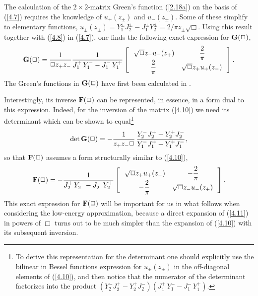 \documentclass[a4paper,preprint,nofootinbib,
                 showpacs,preprintnumbers,amsmath,amssymb]{revtex4}
\begin{document}
The calculation of the $2\times2$-matrix Green's function 
(\ref{2.18a}) on the basis of (\ref{4.7}) requires the knowledge 
of $u_+(z_\pm)$ and $u_-(z_\pm)$. Some of these simplify to 
elementary functions, 
    $u_\pm(z_\pm)=Y_1^\pm J_2^\pm 
    -J_1^\pm Y_2^\pm=2/{\pi z_\pm\sqrt\Box}$. 
Using this result together with (\ref{4.8}) in (\ref{4.7}), one 
finds the following exact expression for ${\bf G}(\Box)$, 
    \begin{equation} 
    {\bf G}(\Box) =\frac{1}{\Box z_+ z_-} 
    \frac{1}{J_1^+\,Y_1^-  - J_1^-\,Y_1^+ } 
    \left[\begin{array}{cc} 
    \,\sqrt{\Box} z_-u_-(z_+)&\displaystyle{\frac2\pi} \\ 
    \displaystyle{\frac2\pi}&\sqrt{\Box} z_+u_+(z_-)\, 
    \end{array}\right].                               \label{4.10} 
    \end{equation} 
    The Green's functions in ${\bf G}(\Box)$ have first been calculated in 
    \cite{Grinstein}. 
 
Interestingly, its inverse ${\bf F}(\Box)$ can be represented, in essence, 
in a form dual to this expression. Indeed, for the 
inversion of the matrix (\ref{4.10}) we need its determinant which 
can be shown to equal\footnote{To derive this representation for 
the determinant one should explicitly use the bilinear in Bessel 
functions expression for $u_\pm(z_\pm)$ in the off-diagonal 
elements of (\ref{4.10}), and then notice that the numerator of 
the determinant factorizes into the product 
$(Y_2^-J_2^+-Y_2^+J_2^-)(J_1^+\,Y_1^-- J_1^-\,Y_1^+ )$.} 
    \begin{equation} 
    \det {\bf G}(\Box)=-\frac1{z_+z_-\Box}\, 
    \frac{Y_2^-J_2^+-Y_2^+J_2^-} 
    {Y_1^-J_1^+-Y_1^+J_1^-},         \label{4.10a} 
    \end{equation} 
so that ${\bf F}(\Box)$ assumes a form structurally similar to 
(\ref{4.10}), 
    \begin{equation} 
    {\bf F}(\Box) =-\frac{1}{ J_2^+\,Y_2^- -J_2^-\,Y_2^+} 
    \left[\begin{array}{cc} 
    \,\sqrt{\Box} z_+u_+(z_-)&-\displaystyle{\frac2\pi} \\ 
    -\displaystyle{\frac2\pi}&\sqrt{\Box} z_-u_-(z_+)\, 
    \end{array}\right].                                 \label{4.11} 
    \end{equation} 
This exact expression for ${\bf F}(\Box)$ will be important for us 
in what follows when considering the low-energy approximation, 
because a direct expansion of (\ref{4.11}) in powers of $\Box$ 
turns out to be much simpler than the expansion of (\ref{4.10}) 
with its subsequent inversion. 
 
\end{document}
